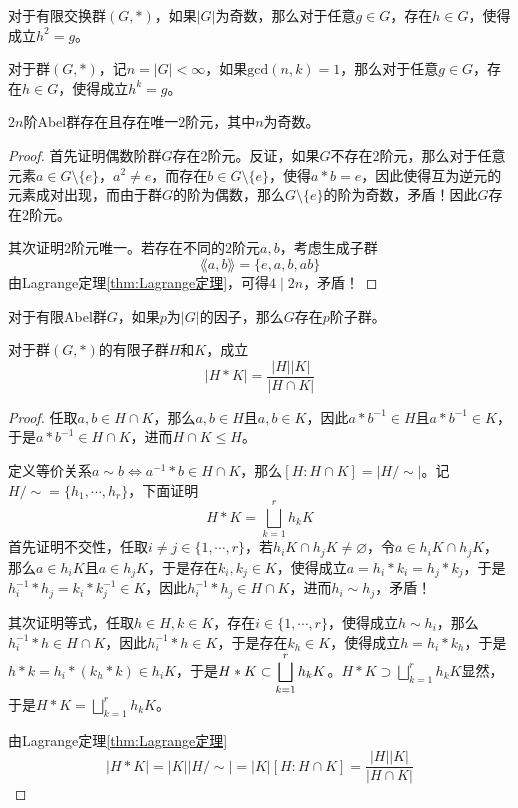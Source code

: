 \begin{proposition}
	对于有限交换群$(G,*)$，如果$|G|$为奇数，那么对于任意$g\in G$，存在$h\in G$，使得成立$h^2=g$。
\end{proposition}

\begin{proposition}
	对于群$(G,*)$，记$n=|G|<\infty$，如果$\mathrm{gcd}(n,k)=1$，那么对于任意$g\in G$，存在$h\in G$，使得成立$h^k=g$。
\end{proposition}

\begin{proposition}
	$2n$阶Abel群存在且存在唯一$2$阶元，其中$n$为奇数。
\end{proposition}

\begin{proof}
	首先证明偶数阶群$G$存在$2$阶元。反证，如果$G$不存在$2$阶元，那么对于任意元素$a\in G\setminus\{e\}$，$a^2\ne e$，而存在$b\in G\setminus\{e\}$，使得$a*b=e$，因此使得互为逆元的元素成对出现，而由于群$G$的阶为偶数，那么$G\setminus\{e\}$的阶为奇数，矛盾！因此$G$存在$2$阶元。
	
	其次证明$2$阶元唯一。若存在不同的$2$阶元$a,b$，考虑生成子群
	$$
	\lang a,b \rang=\{ e,a,b,ab \}
	$$
	由Lagrange定理\ref{thm:Lagrange定理}，可得$4\mid 2n$，矛盾！
\end{proof}

\begin{proposition}
	对于有限Abel群$G$，如果$p$为$|G|$的因子，那么$G$存在$p$阶子群。
\end{proposition}

\begin{proposition}
	对于群$(G,*)$的有限子群$H$和$K$，成立
	$$
	|H*K|=\frac{|H||K|}{|H\cap K|}
	$$
\end{proposition}

\begin{proof}
	任取$a,b\in H\cap K$，那么$a,b\in H$且$a,b\in K$，因此$a*b^{-1}\in H$且$a*b^{-1}\in K$，于是$a*b^{-1}\in H\cap K$，进而$H\cap K\le H$。
	
	定义等价关系$a\sim b\iff a^{-1}*b\in H\cap K$，那么$[H:H\cap K]=| H/\sim |$。记$H/\sim=\{ h_1,\cdots,h_r \}$，下面证明
	$$
	H*K=\bigsqcup_{k=1}^{r}h_k K
	$$
	首先证明不交性，任取$i\ne j\in\{1,\cdots,r\}$，若$h_iK\cap h_jK\ne\varnothing$，令$a\in h_iK\cap h_jK$，那么$a\in h_iK$且$a\in h_jK$，于是存在$k_i,k_j\in K$，使得成立$a=h_i*k_i=h_j*k_j$，于是$h^{-1}_i*h_j=k_i*k^{-1}_j\in K$，因此$h^{-1}_i*h_j\in H\cap K$，进而$h_i\sim h_j$，矛盾！
	
	其次证明等式，任取$h\in H,k\in K$，存在$i\in\{ 1,\cdots,r \}$，使得成立$h\sim h_i$，那么$h^{-1}_i*h\in H\cap K$，因此$h^{-1}_i*h\in K$，于是存在$k_h\in K$，使得成立$h=h_i*k_h$，于是$h*k=h_i*(k_h*k)\in h_i K$，于是$\displaystyle H*K\subset\bigsqcup_{k=1}^{r}h_kK$。$\displaystyle H*K\supset\bigsqcup_{k=1}^{r}h_kK$显然，于是$\displaystyle H*K=\bigsqcup_{k=1}^{r}h_kK$。
	
	由Lagrange定理\ref{thm:Lagrange定理}
	$$
	|H*K|=|K|| H/\sim |=|K|[H:H\cap K]=\frac{|H||K|}{|H\cap K|}
	$$
\end{proof}

